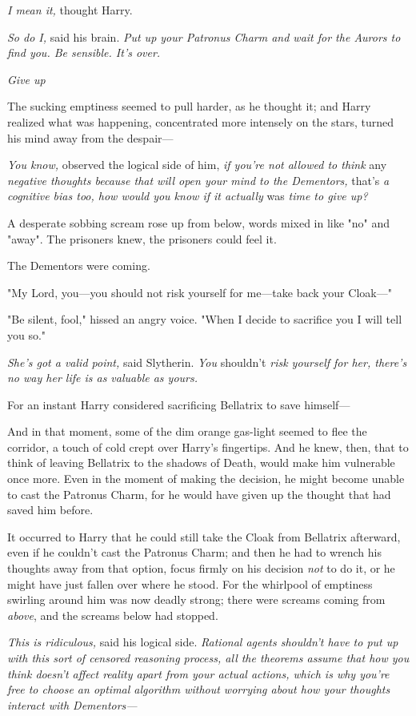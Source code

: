 \emph{I mean it,} thought Harry.

\emph{So do I,} said his brain. \emph{Put up your Patronus Charm and wait for
the Aurors to find you. Be sensible. It's over.}

\emph{Give up{\el}}

The sucking emptiness seemed to pull harder, as he thought it; and Harry
realized what was happening, concentrated more intensely on the stars, turned
his mind away from the despair—

\emph{You know,} observed the logical side of him, \emph{if you're not allowed
to think} any \emph{negative thoughts because that will open your mind to the
Dementors,} that's \emph{a cognitive bias too, how would you know if it
actually} was \emph{time to give up?}

A desperate sobbing scream rose up from below, words mixed in like "no" and
"away". The prisoners knew, the prisoners could feel it.

The Dementors were coming.

"My Lord, you—you should not risk yourself for me—take back your Cloak—"

"Be silent, fool," hissed an angry voice. "When I decide to sacrifice you I
will tell you so."

\emph{She's got a valid point,} said Slytherin. \emph{You} shouldn't \emph{risk
yourself for her, there's no way her life is as valuable as yours.}

For an instant Harry considered sacrificing Bellatrix to save himself—

And in that moment, some of the dim orange gas-light seemed to flee the
corridor, a touch of cold crept over Harry's fingertips. And he knew, then,
that to think of leaving Bellatrix to the shadows of Death, would make him
vulnerable once more. Even in the moment of making the decision, he might
become unable to cast the Patronus Charm, for he would have given up the
thought that had saved him before.

It occurred to Harry that he could still take the Cloak from Bellatrix
afterward, even if he couldn't cast the Patronus Charm; and then he had to
wrench his thoughts away from that option, focus firmly on his decision
\emph{not} to do it, or he might have just fallen over where he stood. For the
whirlpool of emptiness swirling around him was now deadly strong; there were
screams coming from \emph{above}, and the screams below had stopped.

\emph{This is ridiculous,} said his logical side. \emph{Rational agents
shouldn't have to put up with this sort of censored reasoning process, all the
theorems assume that how you think doesn't affect reality apart from your
actual actions, which is why you're free to choose an optimal algorithm without
worrying about how your thoughts interact with Dementors—}

